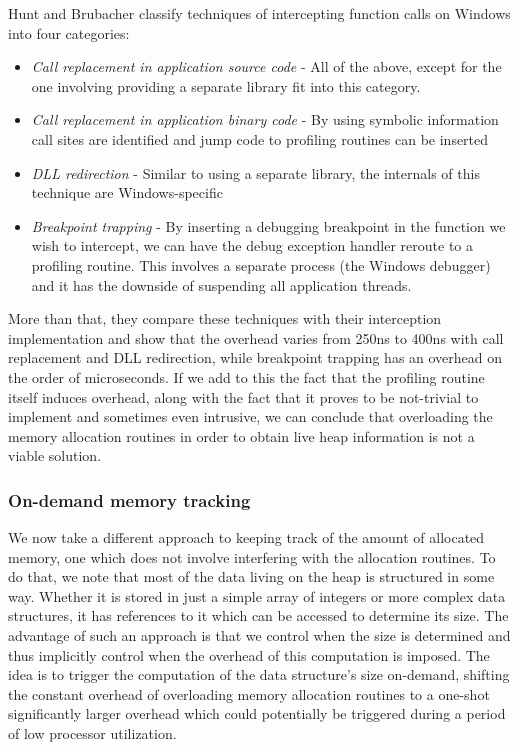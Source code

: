 Hunt and Brubacher\cite{Hunt99} classify techniques of intercepting function calls on Windows into four categories:
\begin{itemize}
\item \textit{Call replacement in application source code} - All of the above, except for the one involving providing a separate library fit into this category.
\item \textit{Call replacement in application binary code} - By using symbolic information call sites are identified and jump code to profiling routines can be inserted
\item \textit{DLL redirection} - Similar to using a separate library, the internals of this technique are Windows-specific
\item \textit{Breakpoint trapping} - By inserting a debugging breakpoint in the function we wish to intercept, we can have the debug exception handler reroute to a profiling routine. This involves a separate process (the Windows debugger) and it has the downside of suspending all application threads.
\end{itemize}
More than that, they compare these techniques with their interception implementation and show that the overhead varies from 250ns to 400ns with call replacement and DLL redirection, while breakpoint trapping has an overhead on the order of microseconds. If we add to this the fact that the profiling routine itself induces overhead, along with the fact that it proves to be not-trivial to implement and sometimes even intrusive, we can conclude that overloading the memory allocation routines in order to obtain live heap information is not a viable solution.

\subsubsection{On-demand memory tracking}
\label{subsubsection:ondemandtracking}

We now take a different approach to keeping track of the amount of allocated memory, one which does not involve interfering with the allocation routines. To do that, we note that most of the data living on the heap is structured in some way. Whether it is stored in just a simple array of integers or more complex data structures, it has references to it which can be accessed to determine its size. The advantage of such an approach is that we control when the size is determined and thus implicitly control when the overhead of this computation is imposed. The idea is to trigger the computation of the data structure's size on-demand, shifting the constant overhead of overloading memory allocation routines to a one-shot significantly larger overhead which could potentially be triggered during a period of low processor utilization.

